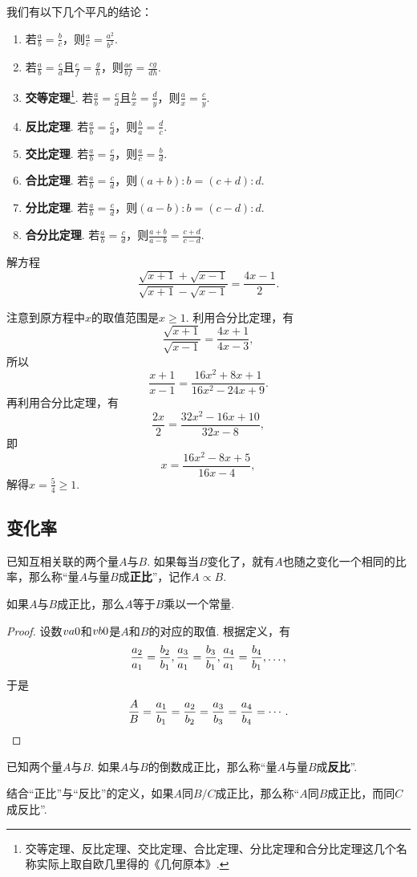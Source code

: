 我们有以下几个平凡的结论：\begin{enumerate}
\item 若\(\frac{a}{b} = \frac{b}{c}\)，则\(\frac{a}{c} = \frac{a^2}{b^2}\).
\item 若\(\frac{a}{b} = \frac{c}{d}\)且\(\frac{e}{f} = \frac{g}{h}\)，则\(\frac{ae}{bf} = \frac{cg}{dh}\).
\item {\bf 交等定理}\footnote{%
交等定理、反比定理、交比定理、合比定理、分比定理和合分比定理这几个名称实际上取自欧几里得的《几何原本》.%
}.
若\(\frac{a}{b} = \frac{c}{d}\)且\(\frac{b}{x} = \frac{d}{y}\)，则\(\frac{a}{x} = \frac{c}{y}\).
\item {\bf 反比定理}.
若\(\frac{a}{b} = \frac{c}{d}\)，则\(\frac{b}{a} = \frac{d}{c}\).
\item {\bf 交比定理}.
若\(\frac{a}{b} = \frac{c}{d}\)，则\(\frac{a}{c} = \frac{b}{d}\).
\item {\bf 合比定理}.
若\(\frac{a}{b} = \frac{c}{d}\)，则\((a+b):b = (c+d):d\).
\item {\bf 分比定理}.
若\(\frac{a}{b} = \frac{c}{d}\)，则\((a-b):b = (c-d):d\).
\item {\bf 合分比定理}.
若\(\frac{a}{b} = \frac{c}{d}\)，则\(\frac{a+b}{a-b} = \frac{c+d}{c-d}\).
\end{enumerate}

\begin{example}
解方程\[
\frac{\sqrt{x+1}+\sqrt{x-1}}{\sqrt{x+1}-\sqrt{x-1}} = \frac{4x-1}{2}.
\]
\begin{solution}
注意到原方程中\(x\)的取值范围是\(x\geqslant1\).
利用合分比定理，有\[
\frac{\sqrt{x+1}}{\sqrt{x-1}} = \frac{4x+1}{4x-3},
\]所以\[
\frac{x+1}{x-1} = \frac{16x^2+8x+1}{16x^2-24x+9}.
\]再利用合分比定理，有\[
\frac{2x}{2} = \frac{32x^2-16x+10}{32x-8},
\]即\[
x = \frac{16x^2-8x+5}{16x-4},
\]解得\(x=\frac{5}{4} \geqslant1\).
\end{solution}
\end{example}

\subsection{变化率}
\begin{definition}
已知互相关联的两个量\(A\)与\(B\).
如果每当\(B\)变化了，就有\(A\)也随之变化一个相同的比率，那么称“量\(A\)与量\(B\)成\textbf{正比}”，记作\(A \propto B\).
\end{definition}

\begin{theorem}
如果\(A\)与\(B\)成正比，那么\(A\)等于\(B\)乘以一个常量.
\begin{proof}
设数\(v{a}{0}\)和\(v{b}{0}\)是\(A\)和\(B\)的对应的取值.
根据定义，有\[
\def\f#1{%
\frac{a_#1}{a_1} = \frac{b_#1}{b_1}%
}
\f2,\f3,\f4,\dotsc,
\]于是\[
\def\f#1{\frac{a_#1}{b_#1}}
\frac{A}{B} = \f1 = \f2 = \f3 = \f4 = \dotsb.
\qedhere
\]
\end{proof}
\end{theorem}

\begin{definition}
已知两个量\(A\)与\(B\).
如果\(A\)与\(B\)的倒数成正比，那么称“量\(A\)与量\(B\)成\textbf{反比}”.
\end{definition}

结合“正比”与“反比”的定义，如果\(A\)同\(B/C\)成正比，那么称“\(A\)同\(B\)成正比，而同\(C\)成反比”.
